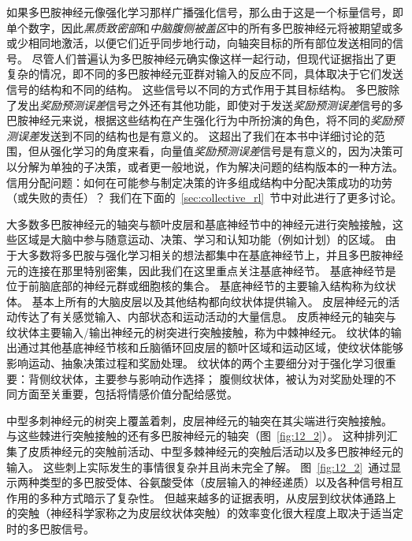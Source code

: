 如果多巴胺神经元像强化学习那样广播强化信号，那么由于这是一个标量信号，即单个数字，因此\textit{黑质致密部}和\textit{中脑腹侧被盖区}中的所有多巴胺神经元将被期望或多或少相同地激活，以便它们近乎同步地行动，向轴突目标的所有部位发送相同的信号。 
尽管人们普遍认为多巴胺神经元确实像这样一起行动，但现代证据指出了更复杂的情况，即不同的多巴胺神经元亚群对输入的反应不同，具体取决于它们发送信号的结构和不同的结构。
这些信号以不同的方式作用于其目标结构。
多巴胺除了发出\textit{奖励预测误差}信号之外还有其他功能，即使对于发送\textit{奖励预测误差}信号的多巴胺神经元来说，根据这些结构在产生强化行为中所扮演的角色，将不同的\textit{奖励预测误差}发送到不同的结构也是有意义的。
这超出了我们在本书中详细讨论的范围，但从强化学习的角度来看，向量值\textit{奖励预测误差}信号是有意义的，因为决策可以分解为单独的子决策，或者更一般地说，作为解决问题的结构版本的一种方法。
信用分配问题：如何在可能参与制定决策的许多组成结构中分配决策成功的功劳（或失败的责任）？
我们在下面的~\ref{sec:collective_rl}~节中对此进行了更多讨论。


大多数多巴胺神经元的轴突与额叶皮层和基底神经节中的神经元进行突触接触，这些区域是大脑中参与随意运动、决策、学习和认知功能（例如计划）的区域。
由于大多数将多巴胺与强化学习相关的想法都集中在基底神经节上，并且多巴胺神经元的连接在那里特别密集，因此我们在这里重点关注基底神经节。
基底神经节是位于前脑底部的神经元群或细胞核的集合。 基底神经节的主要输入结构称为纹状体。
基本上所有的大脑皮层以及其他结构都向纹状体提供输入。
皮层神经元的活动传达了有关感觉输入、内部状态和运动活动的大量信息。
皮质神经元的轴突与纹状体主要输入/输出神经元的树突进行突触接触，称为中棘神经元。
纹状体的输出通过其他基底神经节核和丘脑循环回皮层的额叶区域和运动区域，使纹状体能够影响运动、抽象决策过程和奖励处理。
纹状体的两个主要细分对于强化学习很重要：背侧纹状体，主要参与影响动作选择；
腹侧纹状体，被认为对奖励处理的不同方面至关重要，包括将情感价值分配给感觉。



中型多刺神经元的树突上覆盖着刺，皮层神经元的轴突在其尖端进行突触接触。
与这些棘进行突触接触的还有多巴胺神经元的轴突（图~\ref{fig:12_2}）。
这种排列汇集了皮质神经元的突触前活动、中型多棘神经元的突触后活动以及多巴胺神经元的输入。
这些刺上实际发生的事情很复杂并且尚未完全了解。
图~\ref{fig:12_2}~通过显示两种类型的多巴胺受体、谷氨酸受体（皮层输入的神经递质）以及各种信号相互作用的多种方式暗示了复杂性。
但越来越多的证据表明，从皮层到纹状体通路上的突触（神经科学家称之为皮层纹状体突触）的效率变化很大程度上取决于适当定时的多巴胺信号。



